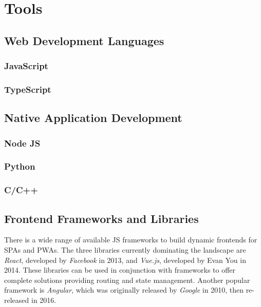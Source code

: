 \chapter{Tools}



\section{Web Development Languages}

\subsection{JavaScript}

\subsection{TypeScript}


\section{Native Application Development}

\subsection{Node JS}

\subsection{Python}

\subsection{C/C++}



\section{Frontend Frameworks and Libraries}

There is a wide range of available \ac{JS} frameworks to build dynamic frontends for \ac{SPA}s and \ac{PWA}s. The three libraries currently dominating the landscape are \emph{React}, developed by \emph{Facebook} in 2013, and \emph{Vue.js}, developed by Evan You in 2014. These libraries can be used in conjunction with frameworks to offer complete solutions providing routing and state management. Another popular framework is \emph{Angular}, which was originally released by \emph{Google} in 2010, then re-released in 2016.

